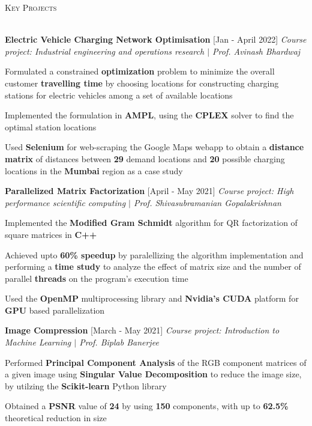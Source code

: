 \documentclass[11pt]{article}
\renewcommand{\section}[1]{
    \vspace*{8pt}
    \textsc{\LARGE{#1}}
    \vspace*{-10pt} \\ \hspace*{-5pt} 
    \hrulefill \\
    \vspace*{-15pt}
    \vspace*{-8pt}
}
\newcommand{\smallbullet}{
    \small$\bullet$
}
\newcommand{\bigblock}[3]{
    {
        \vspace*{5pt}
        \hspace*{-8pt} \large{\textbf{#1}} \hfill #2 \newline
        \textit{\textsf{#3}}
    }
}
\newenvironment{bullet-list-minor}{
    \begin{list}{
        \smallbullet
    }{
        \setlength\leftmargin{30pt}\topsep -5pt \itemsep -6pt
    }
} {
    \end{list}
}
\begin{document}

    \section{Key Projects}

    \bigblock{
        Electric Vehicle Charging Network Optimisation
    }{
        [Jan - April 2022]
    }{
        Course project: Industrial engineering and operations research \(|\) Prof. Avinash Bhardwaj
    }
	\begin{bullet-list-minor}
        \item Formulated a constrained \textbf{optimization} problem to minimize the overall customer \textbf{travelling time} by choosing locations for constructing charging stations for electric vehicles among a set of available locations
        \item Implemented the formulation in \textbf{AMPL}, using the \textbf{CPLEX} solver to find the optimal station locations
        \item Used \textbf{Selenium} for web-scraping the Google Maps webapp to obtain a \textbf{distance matrix} of distances between \textbf{29} demand locations and \textbf{20} possible charging locations in the \textbf{Mumbai} region as a case study
    \end{bullet-list-minor}

    \bigblock{
        Parallelized Matrix Factorization
    }{
        [April - May 2021]
    }{
        Course project: High performance scientific computing \(|\) Prof. Shivasubramanian Gopalakrishnan
    }
	\begin{bullet-list-minor}
        \item Implemented the \textbf{Modified Gram Schmidt} algorithm for QR factorization of square matrices in \textbf{C++}
        \item Achieved upto \textbf{60\% speedup} by paralellizing the algorithm implementation and performing a \textbf{time study} to analyze the effect of matrix size and the number of parallel \textbf{threads} on the program's execution time
        \item Used the \textbf{OpenMP} multiprocessing library and \textbf{Nvidia's CUDA} platform for \textbf{GPU} based parallelization
    \end{bullet-list-minor}

    \bigblock{
        Image Compression
    }{
        [March - May 2021]
    }{
        Course project: Introduction to Machine Learning \(|\) Prof. Biplab Banerjee
    }
	\begin{bullet-list-minor}
        \item Performed \textbf{Principal Component Analysis} of the RGB component matrices of a given image using \textbf{Singular Value Decomposition} to reduce the image size, by utilzing the \textbf{Scikit-learn} Python library
        \item Obtained a \textbf{PSNR} value of \textbf{24} by using \textbf{150} components, with up to \textbf{62.5\%} theoretical reduction in size
    \end{bullet-list-minor}
\end{document}
